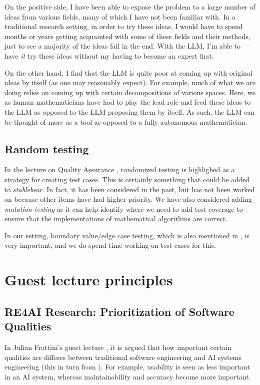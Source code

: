 \documentclass[a4paper,11pt]{article}
\begin{document}
On the positive side, I have been able to expose the problem to a large number of ideas from various fields, many of which I have not been familiar with. In a traditional research setting, in order to try these ideas, I would have to spend months or years getting acquainted with some of these fields and their methods, just to see a majority of the ideas fail in the end. With the LLM, I'm able to have \emph{it} try these ideas without my having to become an expert first.

On the other hand, I find that the LLM is quite poor at coming up with original ideas by itself (as one may reasonably expect). For example, much of what we are doing relies on coming up with certain decompositions of various spaces. Here, we as human mathematicians have had to play the lead role and feed these ideas to the LLM as opposed to the LLM proposing them by itself. As such, the LLM can be thought of more as a tool as opposed to a fully autonomous mathematician.

\subsection{Random testing}

In the lecture on Quality Assurance \cite{feldt2026qa}, randomized testing is highlighed as a strategy for creating test cases. This is certainly something that could be added to \emph{stablebear}. In fact, it has been considered in the past, but has not been worked on because other items have had higher priority. We have also considered adding \emph{mutation testing} as it can help identify where we need to add test coverage to ensure that the implementations of mathematical algorithms are correct. 

In our setting, boundary value/edge case testing, which is also mentioned in \cite{feldt2026qa}, is very important, and we do spend time working on test cases for this.

\section{Guest lecture principles}

\subsection{RE4AI Research:
Prioritization of Software Qualities}

In Julian Frattini's guest lecture \cite{frattini2026agentic}, it is argued that how important certain qualities are differes between traditional software engineering and AI systems engineering (this in turn from \cite{Habibullah2023Non}). For example, usability is seen as less important in an AI system, whereas maintainability and accuracy become more important.
\end{document}

